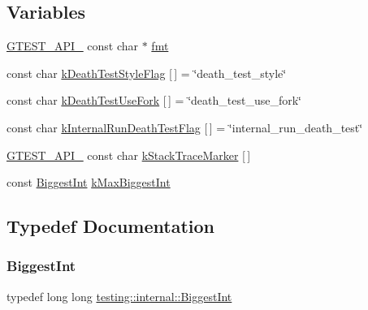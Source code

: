 \subsection*{Variables}
\begin{DoxyCompactItemize}
\item 
\hyperlink{gtest-port_8h_aa73be6f0ba4a7456180a94904ce17790}{G\+T\+E\+S\+T\+\_\+\+A\+P\+I\+\_\+} const char $\ast$ \hyperlink{namespacetesting_1_1internal_a40b2a93ff318f5975eb8246b01221ce8}{fmt}
\item 
const char \hyperlink{namespacetesting_1_1internal_a008ebfe0c0347d65e5e06e4d310981b3}{k\+Death\+Test\+Style\+Flag} \mbox{[}$\,$\mbox{]} = \char`\"{}death\+\_\+test\+\_\+style\char`\"{}
\item 
const char \hyperlink{namespacetesting_1_1internal_a32051e2574562b548be3e26a52eaa553}{k\+Death\+Test\+Use\+Fork} \mbox{[}$\,$\mbox{]} = \char`\"{}death\+\_\+test\+\_\+use\+\_\+fork\char`\"{}
\item 
const char \hyperlink{namespacetesting_1_1internal_a8572303d929880adf30db00952e1c45d}{k\+Internal\+Run\+Death\+Test\+Flag} \mbox{[}$\,$\mbox{]} = \char`\"{}internal\+\_\+run\+\_\+death\+\_\+test\char`\"{}
\item 
\hyperlink{gtest-port_8h_aa73be6f0ba4a7456180a94904ce17790}{G\+T\+E\+S\+T\+\_\+\+A\+P\+I\+\_\+} const char \hyperlink{namespacetesting_1_1internal_a999c7ef9ff01b6d2d76669372c444aa3}{k\+Stack\+Trace\+Marker} \mbox{[}$\,$\mbox{]}
\item 
const \hyperlink{namespacetesting_1_1internal_a05c6bd9ede5ccdf25191a590d610dcc6}{Biggest\+Int} \hyperlink{namespacetesting_1_1internal_ad901880198832bc166d2493096b451f7}{k\+Max\+Biggest\+Int}
\end{DoxyCompactItemize}


\subsection{Typedef Documentation}
\mbox{\label{namespacetesting_1_1internal_a05c6bd9ede5ccdf25191a590d610dcc6}} 
\subsubsection{\texorpdfstring{Biggest\+Int}{BiggestInt}}
{\footnotesize\ttfamily typedef long long \hyperlink{namespacetesting_1_1internal_a05c6bd9ede5ccdf25191a590d610dcc6}{testing\+::internal\+::\+Biggest\+Int}}

